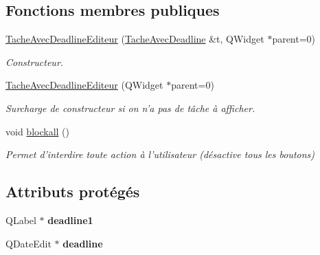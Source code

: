 \subsection*{Fonctions membres publiques}
\begin{DoxyCompactItemize}
\item 
\hyperlink{class_tache_avec_deadline_editeur_aa56d0511ae2f2ca9ae20881df4852ed5}{Tache\-Avec\-Deadline\-Editeur} (\hyperlink{class_tache_avec_deadline}{Tache\-Avec\-Deadline} \&t, Q\-Widget $\ast$parent=0)
\begin{DoxyCompactList}\small\item\em Constructeur. \end{DoxyCompactList}\item 
\hypertarget{class_tache_avec_deadline_editeur_ab851241684748660a8eb640e176539e0}{\hyperlink{class_tache_avec_deadline_editeur_ab851241684748660a8eb640e176539e0}{Tache\-Avec\-Deadline\-Editeur} (Q\-Widget $\ast$parent=0)}\label{class_tache_avec_deadline_editeur_ab851241684748660a8eb640e176539e0}

\begin{DoxyCompactList}\small\item\em Surcharge de constructeur si on n'a pas de tâche à afficher. \end{DoxyCompactList}\item 
\hypertarget{class_tache_avec_deadline_editeur_a6846c1e2cb58616ee11906fec57374ad}{void \hyperlink{class_tache_avec_deadline_editeur_a6846c1e2cb58616ee11906fec57374ad}{blockall} ()}\label{class_tache_avec_deadline_editeur_a6846c1e2cb58616ee11906fec57374ad}

\begin{DoxyCompactList}\small\item\em Permet d'interdire toute action à l'utilisateur (désactive tous les boutons) \end{DoxyCompactList}\end{DoxyCompactItemize}
\subsection*{Attributs protégés}
\begin{DoxyCompactItemize}
\item 
\hypertarget{class_tache_avec_deadline_editeur_a350f2f88b99289cef5d815a855364718}{Q\-Label $\ast$ {\bfseries deadline1}}\label{class_tache_avec_deadline_editeur_a350f2f88b99289cef5d815a855364718}

\item 
\hypertarget{class_tache_avec_deadline_editeur_ab5299170c8c8cd9fa705e1c6d28fc607}{Q\-Date\-Edit $\ast$ {\bfseries deadline}}\label{class_tache_avec_deadline_editeur_ab5299170c8c8cd9fa705e1c6d28fc607}

\end{DoxyCompactItemize}


